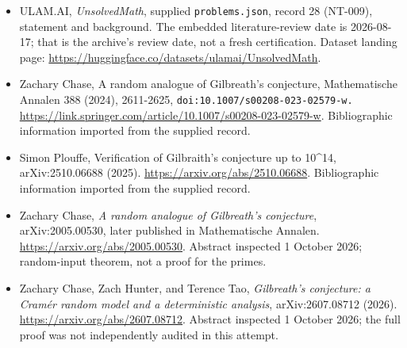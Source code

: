 \documentclass[11pt,a4paper]{article}
\begin{document}
{\small

\begin{itemize}

\item[\hypertarget{source:28:1}{S1}] ULAM.AI, \emph{UnsolvedMath}, supplied \texttt{problems.json}, record 28 (NT-009), statement and background. The embedded literature-review date is 2026-08-17; that is the archive’s review date, not a fresh certification. Dataset landing page: \url{https://huggingface.co/datasets/ulamai/UnsolvedMath}.

\item[\hypertarget{source:28:2}{S2}] Zachary Chase, A random analogue of Gilbreath's conjecture, Mathematische Annalen 388 (2024), 2611-2625, \nolinkurl{doi:10.1007/s00208-023-02579-w.} \url{https://link.springer.com/article/10.1007/s00208-023-02579-w}. Bibliographic information imported from the supplied record.

\item[\hypertarget{source:28:3}{S3}] Simon Plouffe, Verification of Gilbraith's conjecture up to 10\textasciicircum{}14, arXiv:2510.06688 (2025). \url{https://arxiv.org/abs/2510.06688}. Bibliographic information imported from the supplied record.


\item[E1] Zachary Chase, \emph{A random analogue of Gilbreath's
conjecture}, arXiv:2005.00530, later published in Mathematische Annalen.
\url{https://arxiv.org/abs/2005.00530}. Abstract inspected 1 October 2026;
random-input theorem, not a proof for the primes.
\item[E2] Zachary Chase, Zach Hunter, and Terence Tao,
\emph{Gilbreath's conjecture: a Cram\'er random model and a deterministic
analysis}, arXiv:2607.08712 (2026).
\url{https://arxiv.org/abs/2607.08712}. Abstract inspected 1 October 2026;
the full proof was not independently audited in this attempt.

\end{itemize}

}

\label{end:28}
\end{document}
